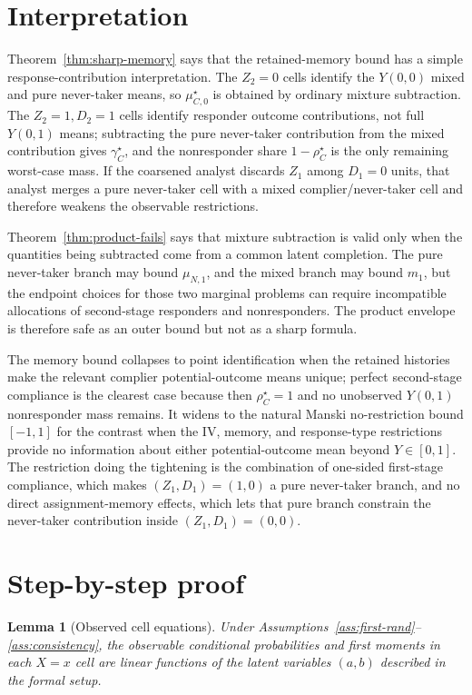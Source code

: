 \documentclass[11pt]{article}
\theoremstyle{definition}
\theoremstyle{plain}
\newtheorem{lemma}{Lemma}
\theoremstyle{remark}
\begin{document}
\section{Interpretation}
Theorem~\ref{thm:sharp-memory} says that the retained-memory bound has a simple response-contribution interpretation.  The \(Z_2=0\) cells identify the \(Y(0,0)\) mixed and pure never-taker means, so \(\mu_{C,0}^{\star}\) is obtained by ordinary mixture subtraction.  The \(Z_2=1,D_2=1\) cells identify responder outcome contributions, not full \(Y(0,1)\) means; subtracting the pure never-taker contribution from the mixed contribution gives \(\gamma_C^{\star}\), and the nonresponder share \(1-\rho_C^{\star}\) is the only remaining worst-case mass.  If the coarsened analyst discards \(Z_1\) among \(D_1=0\) units, that analyst merges a pure never-taker cell with a mixed complier/never-taker cell and therefore weakens the observable restrictions.

Theorem~\ref{thm:product-fails} says that mixture subtraction is valid only when the quantities being subtracted come from a common latent completion.  The pure never-taker branch may bound \(\mu_{N,1}\), and the mixed branch may bound \(m_1\), but the endpoint choices for those two marginal problems can require incompatible allocations of second-stage responders and nonresponders.  The product envelope is therefore safe as an outer bound but not as a sharp formula.

The memory bound collapses to point identification when the retained histories make the relevant complier potential-outcome means unique; perfect second-stage compliance is the clearest case because then \(\rho_C^{\star}=1\) and no unobserved \(Y(0,1)\) nonresponder mass remains.  It widens to the natural Manski no-restriction bound \([-1,1]\) for the contrast when the IV, memory, and response-type restrictions provide no information about either potential-outcome mean beyond \(Y\in[0,1]\).  The restriction doing the tightening is the combination of one-sided first-stage compliance, which makes \((Z_1,D_1)=(1,0)\) a pure never-taker branch, and no direct assignment-memory effects, which lets that pure branch constrain the never-taker contribution inside \((Z_1,D_1)=(0,0)\).

\section{Step-by-step proof}
\begin{lemma}[Observed cell equations]\label{lem:cell-equations}
Under Assumptions~\ref{ass:first-rand}--\ref{ass:consistency}, the observable conditional probabilities and first moments in each \(X=x\) cell are linear functions of the latent variables \((a,b)\) described in the formal setup.
\end{lemma}
\end{document}
